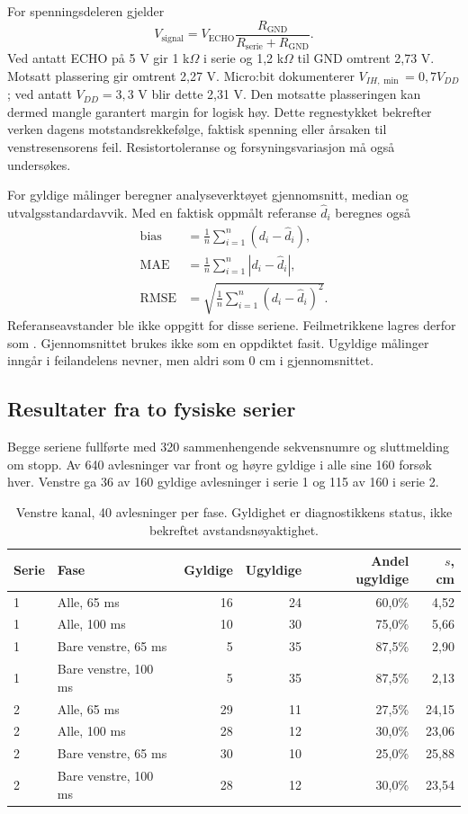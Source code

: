 For spenningsdeleren gjelder
\begin{equation}
 V_{\mathrm{signal}}=V_{\mathrm{ECHO}}
 \frac{R_{\mathrm{GND}}}{R_{\mathrm{serie}}+R_{\mathrm{GND}}}.
\end{equation}
Ved antatt ECHO på 5 V gir 1 k\(\Omega\) i serie og 1,2 k\(\Omega\)
til GND omtrent 2,73 V. Motsatt plassering gir omtrent 2,27 V.
Micro:bit dokumenterer \(V_{IH,\min}=0{,}7V_{DD}\)\cite{pins}; ved
antatt \(V_{DD}=3{,}3\) V blir dette 2,31 V. Den motsatte plasseringen
kan dermed mangle garantert margin for logisk høy. Dette regnestykket
bekrefter verken dagens motstandsrekkefølge, faktisk spenning eller
årsaken til venstresensorens feil. Resistortoleranse og forsyningsvariasjon
må også undersøkes.

For gyldige målinger beregner analyseverktøyet gjennomsnitt, median og
utvalgsstandardavvik. Med en faktisk oppmålt referanse \(\hat d_i\)
beregnes også
\begin{align}
 \operatorname{bias}&=\frac1n\sum_{i=1}^{n}(d_i-\hat d_i),\\
 \operatorname{MAE}&=\frac1n\sum_{i=1}^{n}|d_i-\hat d_i|,\\
 \operatorname{RMSE}&=\sqrt{\frac1n\sum_{i=1}^{n}(d_i-\hat d_i)^2}.
\end{align}
Referanseavstander ble ikke oppgitt for disse seriene. Feilmetrikkene
lagres derfor som . Gjennomsnittet brukes ikke som en oppdiktet
fasit. Ugyldige målinger inngår i feilandelens nevner, men aldri som
0 cm i gjennomsnittet.

\subsection{Resultater fra to fysiske serier}
Begge seriene fullførte med 320 sammenhengende sekvensnumre og
sluttmelding om stopp. Av 640 avlesninger var
front og høyre gyldige i alle sine 160 forsøk hver. Venstre ga 36 av 160
gyldige avlesninger i serie 1 og 115 av 160 i serie 2.

\begin{table}[htbp]
\centering\small
\caption{Venstre kanal, 40 avlesninger per fase. Gyldighet er
diagnostikkens status, ikke bekreftet avstandsnøyaktighet.}
\begin{tabular}{llrrrr}\toprule
Serie & Fase & Gyldige & Ugyldige & Andel ugyldige & \(s\), cm \\\midrule
1 & Alle, 65 ms &16&24&60,0\%&4,52\\
1 & Alle, 100 ms&10&30&75,0\%&5,66\\
1 & Bare venstre, 65 ms&5&35&87,5\%&2,90\\
1 & Bare venstre, 100 ms&5&35&87,5\%&2,13\\\midrule
2 & Alle, 65 ms&29&11&27,5\%&24,15\\
2 & Alle, 100 ms&28&12&30,0\%&23,06\\
2 & Bare venstre, 65 ms&30&10&25,0\%&25,88\\
2 & Bare venstre, 100 ms&28&12&30,0\%&23,54\\\bottomrule
\end{tabular}
\label{tab:left-sensor23}
\end{table}

